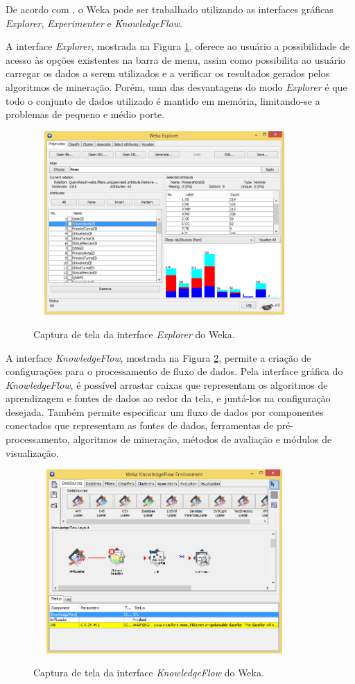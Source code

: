 De acordo com \citet{witten2005}, o Weka pode ser trabalhado utilizando as interfaces gráficas \textit{Explorer}, \textit{Experimenter} e \textit{KnowledgeFlow}. 

A interface \textit{Explorer}, mostrada na Figura \ref{modo1}, oferece ao usuário a possibilidade de acesso às opções existentes na barra de menu, assim como possibilita ao usuário carregar os dados a serem utilizados e a verificar os resultados gerados pelos algoritmos de mineração. Porém, uma das desvantagens do modo \textit{Explorer} é que todo o conjunto de dados utilizado é mantido em memória, limitando-se a problemas de pequeno e médio porte.

\begin{figure}[!htb]
	\centering
	{\includegraphics[width=10cm,height=7cm]{images/modo1}}
	\caption {Captura de tela da interface \textit{Explorer} do Weka.}
	\label{modo1}
\end{figure}


A interface \textit{KnowledgeFlow}, mostrada na Figura \ref{modo2}, permite a criação de configurações para o processamento de fluxo de dados. Pela interface gráfica do \textit{KnowledgeFlow}, é possível arrastar caixas que representam os algoritmos de aprendizagem e fontes de dados ao redor da tela, e juntá-los na configuração desejada. Também permite especificar um fluxo de dados por componentes conectados que representam  as fontes de dados, ferramentas de pré-processamento, algoritmos de mineração, métodos de avaliação e módulos de visualização.

\begin{figure}[!h]
	\centering
	{\includegraphics[width=10cm,height=7cm]{images/modo2}}
	\caption {Captura de tela da interface \textit{KnowledgeFlow} do Weka.}
	\label{modo2}
\end{figure}

